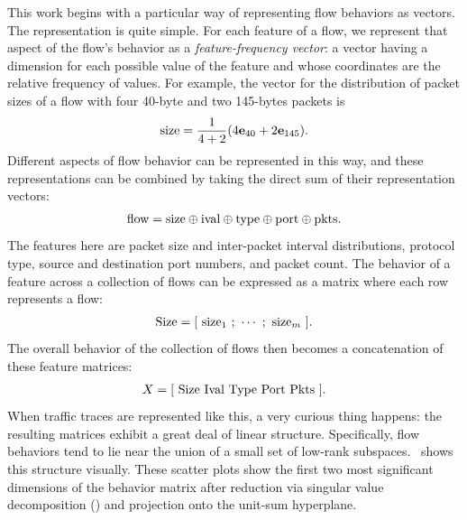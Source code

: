 \documentclass{acm_proc_article-sp}
\begin{document}
This work begins with a particular way of representing flow behaviors as vectors.
The representation is quite simple.
For each feature of a flow, we represent that aspect of the flow's behavior as a \emph{feature-frequency vector}:
a vector having a dimension for each possible value of the feature and whose coordinates are the relative frequency of values.
For example, the vector for the distribution of packet sizes of a flow with four 40-byte and two 145-bytes packets is
\begin{align}
  \text{size} = \frac{1}{4+2}{\left(4\mathbf{e}_{40} + 2\mathbf{e}_{145}\right)}.
\end{align}
Different aspects of flow behavior can be represented in this way, and these representations can be combined by taking the direct sum of their representation vectors:
\begin{align}\eqn{flow}
  \text{flow} =
  \text{size} \directsum
  \text{ival} \directsum
  \text{type} \directsum
  \text{port} \directsum
  \text{pkts}.
\end{align}
The features here are packet size and inter-packet interval distributions,  protocol type, source and destination port numbers, and packet count.
The behavior of a feature across a collection of flows can be expressed as a matrix where each row represents a flow:
\begin{align}\eqn{Size}
  \text{Size} = \bracket{ ~\text{size}_1~ ; ~\cdots~ ; ~\text{size}_m~ }.
\end{align}
The overall behavior of the collection of flows then becomes a concatenation of these feature matrices:
\begin{align}\eqn{X}
  X = \bracket{ ~
    \text{Size} ~
    \text{Ival} ~
    \text{Type} ~
    \text{Port} ~
    \text{Pkts} ~
  }.
\end{align}
When traffic traces are represented like this, a very curious thing happens:
the resulting matrices exhibit a great deal of linear structure.
Specifically, flow behaviors tend to lie near the union of a small set of low-rank subspaces.
~shows this structure visually.
These scatter plots show the first two most significant dimensions of the behavior matrix after reduction via singular value decomposition () and projection onto the unit-sum hyperplane.
\end{document}
